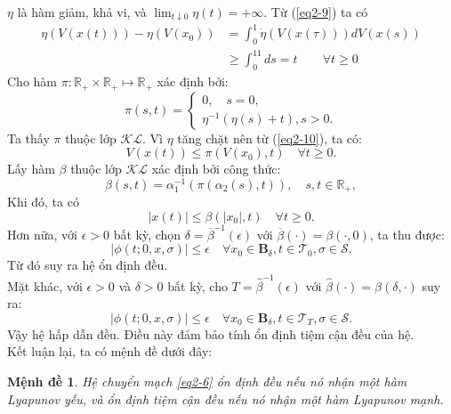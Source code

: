 \documentclass[14pt,a4paper,oneside]{report}		%
\newtheorem{proposition}[theorem]{Mệnh đề}
\theoremstyle{definition}
\begin{document}
$\eta$ là hàm giảm, khả vi, và $\lim_{t\downarrow 0}\eta(t)=+\infty$. Từ (\ref{eq2-9}) ta có
\begin{equation} \label{eq2-10}
\begin{split}
\eta (V(x(t))) - \eta (V(x_0)) & = \int_0^1\dot{\eta}(V(x(\tau)))dV(x(s)) \\
& \geq \int_0^11ds=t\qquad\forall t\geq 0
\end{split}
\end{equation}
Cho hàm $\pi:\mathbb{R}_+\times\mathbb{R}_+\mapsto\mathbb{R}_+$ xác định bởi:
$$\pi(s,t)=
\begin{cases}
0, \quad s=0,\\
\eta^{-1}(\eta(s)+t), s>0.
\end{cases}$$
Ta thấy $\pi$ thuộc lớp $\mathcal{KL}$. Vì $\eta$ tăng chặt nên từ (\ref{eq2-10}), ta có:
$$V(x(t))\leq\pi(V(x_0),t)\quad\forall t\geq 0.$$
Lấy hàm $\beta$ thuộc lớp $\mathcal{KL}$ xác định bởi công thức:
$$\beta(s,t)=\alpha_1^{-1}(\pi(\alpha_2(s),t)), \quad s,t\in\mathbb{R}_+,$$
Khi đó, ta có
$$|x(t)|\leq\beta(|x_0|,t)\quad\forall t\geq 0.$$
Hơn nữa, với $\epsilon>0$ bất kỳ, chọn $\delta=\overline{\beta}^{-1}(\epsilon)$ với $\overline{\beta}(\cdot)=\beta(\cdot,0)$, ta thu được:
$$|\phi(t;0,x,\sigma)|\leq\epsilon\quad\forall x_0\in\mathbf{B}_\delta,t\in\mathcal{T}_0,\sigma\in\mathcal{S}.$$
Từ đó suy ra hệ ổn định đều.\\
Mặt khác, với $\epsilon >0$ và $\delta >0$ bất kỳ, cho $T=\widehat{\beta}^{-1}(\epsilon)$ với $\widehat{\beta}(\cdot)=\beta(\delta,\cdot)$ suy ra:
$$|\phi(t;0,x,\sigma)|\leq\epsilon\quad\forall x_0\in\mathbf{B}_\delta,t\in\mathcal{T}_T,\sigma\in\mathcal{S}.$$
Vậy hệ hấp dẫn đều. Điều này đảm bảo tính ổn định tiệm cận đều của hệ.\\
Kết luận lại, ta có mệnh đề dưới đây:
\begin{proposition} \label{pro2-10}
Hệ chuyển mạch \ref{eq2-6} ổn định đều nếu nó nhận một hàm Lyapunov yếu, và ổn định tiệm cận đều nếu nó nhận một hàm Lyapunov mạnh.
\end{proposition}
\end{document}
